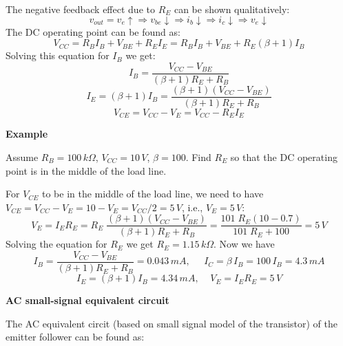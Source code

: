 \documentclass{article}
\begin{document}

The negative feedback effect due to $R_E$ can be shown qualitatively:
\begin{equation}
v_{out}=v_e\uparrow \Longrightarrow v_{be} \downarrow \Longrightarrow 
i_b \downarrow \Longrightarrow i_c \downarrow \Longrightarrow 
v_e\downarrow
\end{equation}
The DC operating point can be found as:
\begin{equation} 
V_{CC}=R_B I_B+V_{BE}+R_E I_E=R_B I_B+V_{BE}+R_E (\beta+1)I_B
\end{equation}
Solving this equation for $I_B$ we get:
\begin{equation}
I_B=\frac{V_{CC}-V_{BE}}{(\beta+1)R_E+R_B} 
\end{equation}
\begin{equation}
I_E=(\beta+1) I_B=\frac{(\beta+1)(V_{CC}-V_{BE})}{(\beta+1)R_E+R_B} 
\end{equation}
\begin{equation}
V_{CE}=V_{CC}-V_E=V_{CC}-R_E I_E 
\end{equation}

{\bf Example}

Assume $R_B=100\,k\Omega$, $V_{CC}=10\,V$, $\beta=100$. Find $R_E$ so
that the DC operating point is in the middle of the load line.

For $V_{CE}$ to be in the middle of the load line, we need to have
$V_{CE}=V_{CC}-V_E=10-V_E=V_{CC}/2=5\,V$, i.e., $V_E=5\,V$:
\begin{equation}
V_E=I_E R_E =R_E\;\frac{(\beta+1) (V_{CC}-V_{BE})}{(\beta+1)R_E+R_B}
=\frac{101\;R_E(10-0.7)}{101\;R_E+100}=5\,V
\end{equation}
Solving the equation for $R_E$ we get $R_E=1.15\,k\Omega$. Now we have
\begin{equation}
I_B=\frac{V_{CC}-V_{BE}}{(\beta+1)R_E+R_B}=0.043\,mA,
\;\;\;\;\;I_C=\beta\,I_B=100\,I_B=4.3\,mA
\end{equation}
\begin{equation}
I_E=(\beta+1)I_B=4.34\,mA,\;\;\;\;V_E=I_ER_E=5\,V
\end{equation}

{\bf AC small-signal equivalent circuit}

The AC equivalent circit (based on small signal model of the 
transistor) of the emitter follower can be found as:

\end{document}
